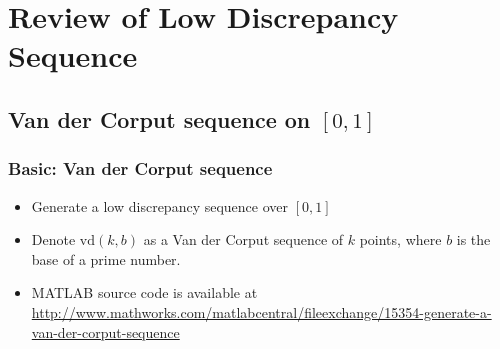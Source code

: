 \documentclass[serif]{beamer} %
\begin{document}
\section{Review of Low Discrepancy Sequence}

\subsection{Van der Corput sequence on $[0,1]$}

\begin{frame}[fragile]
\frametitle{Basic: Van der Corput sequence}
\begin{itemize}
  \item Generate a low discrepancy sequence over $[0,1]$
  \item Denote $\mathrm{vd}(k,b)$ as a Van der Corput sequence of $k$ points, where $b$ is the base of a prime number.
  \item MATLAB source code is available at
  \url{http://www.mathworks.com/matlabcentral/fileexchange/15354-generate-a-van-der-corput-sequence }
\end{itemize}
\begin{example}
  \end{example}
\end{frame}
\end{document}
